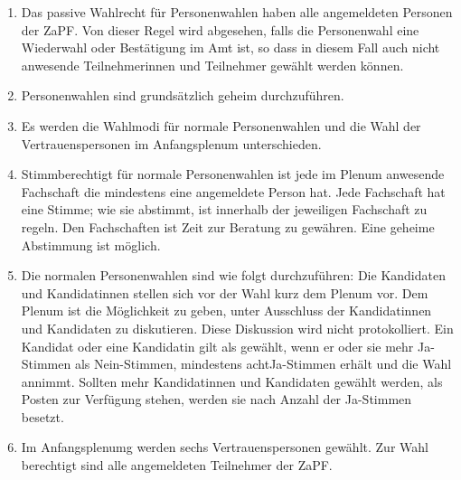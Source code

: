 \documentclass[draft,12pt,oneside]{scrreprt}
\begin{document}
\begin{enumerate}

  \item Das passive Wahlrecht für Personenwahlen haben alle angemeldeten Personen
        der ZaPF. Von dieser Regel wird abgesehen, falls die Personenwahl eine
        Wiederwahl oder Bestätigung im Amt ist, so dass in diesem Fall auch nicht
        anwesende Teilnehmerinnen und Teilnehmer gewählt werden können.

  \item Personenwahlen sind grundsätzlich geheim durchzuführen.

  \item Es werden die Wahlmodi für normale Personenwahlen und die Wahl der
        Vertrauenspersonen im Anfangsplenum unterschieden.

  \item Stimmberechtigt für normale Personenwahlen ist jede im Plenum anwesende
        Fachschaft die mindestens eine angemeldete Person hat.
        Jede Fachschaft hat eine Stimme; wie sie abstimmt, ist innerhalb der
        jeweiligen Fachschaft zu regeln.
        Den Fachschaften ist Zeit zur Beratung zu gewähren.
        Eine geheime Abstimmung ist möglich.

  \item Die normalen Personenwahlen sind wie folgt durchzuführen:
        Die Kandidaten und Kandidatinnen stellen sich vor der Wahl kurz dem
        Plenum vor.
        Dem Plenum ist die Möglichkeit zu geben, unter Ausschluss der Kandidatinnen
        und Kandidaten zu diskutieren.
        Diese Diskussion wird nicht protokolliert.
        Ein Kandidat oder eine Kandidatin gilt als gewählt, wenn er oder sie mehr
        Ja-Stimmen als Nein-Stimmen, mindestens acht\footnotemark Ja-Stimmen
        erhält und die Wahl annimmt.
        Sollten mehr Kandidatinnen und Kandidaten gewählt werden, als Posten zur
        Verfügung stehen, werden sie nach Anzahl der Ja-Stimmen besetzt.

  \item Im Anfangsplenumg werden sechs Vertrauenspersonen gewählt. Zur Wahl
        berechtigt sind alle angemeldeten Teilnehmer der ZaPF.


\end{enumerate}
\end{document}

